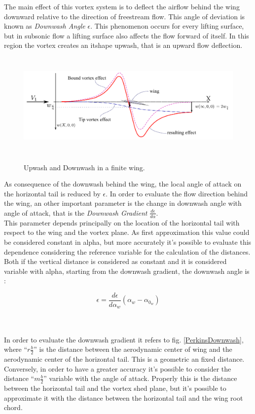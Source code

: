 The main effect of this vortex system is to deflect the airflow behind the wing downward relative to the direction of freestream flow. This angle of deviation is known as {\itshape Downwash Angle} $\epsilon$. This phenomenon occurs for every lifting surface, but in subsonic flow a lifting surface also affects the flow forward of itself. In this region the vortex creates an {itshape upwash}, that is an upward flow deflection.\\


\begin{figure}[H]
\centering
{\includegraphics[height=5.16cm]{Immagini/wing_upwash_downwash.pdf}} 
\caption{Upwash and Downwash in a finite wing.}
\end{figure}

As consequence of the downwash behind the wing, the local angle of attack on the horizontal tail is reduced by  $\epsilon$. In order to evaluate the flow direction behind the wing, an other important parameter is the change in downwash angle with angle of attack, that is the {\itshape Downwash Gradient } $\frac{d\epsilon}{d\alpha}$.\\
This parameter depends principally on the location of the horizontal tail with respect to the wing and the vortex plane. As first approximation this value could be considered constant in alpha, but more accurately it's possible to evaluate this dependence considering the reference variable for the calculation of the distances. 
Both if the vertical distance is considered as constant and it is considered variable with alpha, starting from the downwash gradient, the downwash angle is :

\begin{equation}
\epsilon = \frac {d \epsilon}{d \alpha_w} (\alpha_w - \alpha_{0_w})
\end{equation}

\noindent \\ \\
In order to evaluate the downwash gradient it refers to fig. \ref{PerkinsDownwash}, where ``$r \frac{b}{2}$''  is the distance between the aerodynamic center of wing and the aerodynamic center of the horizontal tail. This is a geometric an fixed distance. Conversely, in order to have a greater accuracy it's possible to consider the distance ``$m  \frac{b}{2}$'' variable with the angle of attack. Properly this is the distance between the horizontal tail and the vortex shed plane, but it's possible to approximate it with the distance between the horizontal tail and the wing root chord.\cite{schimidth}

